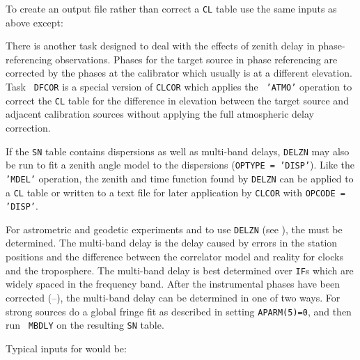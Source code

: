 To create an output file rather than correct a {\tt CL} table use
the same inputs as above except:

There is another task designed to deal with the effects of
zenith delay in phase-referencing observations.  Phases for the
target source in phase referencing are corrected by the phases at the
calibrator which usually is at a different elevation.  Task {\tt
DFCOR} is a special version of {\tt CLCOR} which applies the {\tt
'ATMO'} operation to correct the {\tt CL} table for the difference in
elevation between the target source and adjacent calibration sources
without applying the full atmospheric delay correction.

If the {\tt SN} table contains dispersions as well as multi-band
delays, {\tt DELZN} may also be run to fit a zenith angle model to the
dispersions ({\tt OPTYPE = 'DISP'})\@.  Like the {\tt 'MDEL'}
operation, the zenith and time function found by {\tt DELZN} can be
applied to a {\tt CL} table or written to a text file for later
application by {\tt CLCOR} with {\tt OPCODE = 'DISP'}\@.


For astrometric and geodetic experiments and to use {\tt DELZN}
(see \@), the  must be determined.
The multi-band delay is the delay caused by errors in the station
positions and the difference between the correlator model and reality
for clocks and the troposphere.  The multi-band delay is best
determined over {\tt IF}s which are widely spaced in the frequency
band.  After the instrumental phases have been corrected
(--), the multi-band delay can be determined
in one of two ways. For strong sources do a global fringe fit as
described in  setting {\tt APARM(5)=0}\@, and then run {\tt
MBDLY} on the resulting {\tt SN} table.

Typical inputs for {\tt {}} would be:

